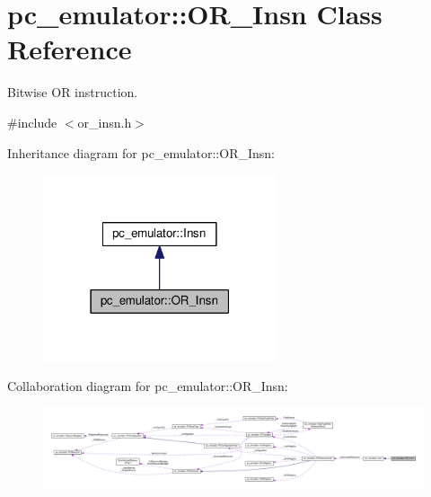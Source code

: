\hypertarget{classpc__emulator_1_1OR__Insn}{}\section{pc\+\_\+emulator\+:\+:O\+R\+\_\+\+Insn Class Reference}
\label{classpc__emulator_1_1OR__Insn}


Bitwise OR instruction.  




{\ttfamily \#include $<$or\+\_\+insn.\+h$>$}



Inheritance diagram for pc\+\_\+emulator\+:\+:O\+R\+\_\+\+Insn\+:\nopagebreak
\begin{figure}[H]
\begin{center}
\leavevmode
\includegraphics[width=195pt]{classpc__emulator_1_1OR__Insn__inherit__graph}
\end{center}
\end{figure}


Collaboration diagram for pc\+\_\+emulator\+:\+:O\+R\+\_\+\+Insn\+:\nopagebreak
\begin{figure}[H]
\begin{center}
\leavevmode
\includegraphics[width=350pt]{classpc__emulator_1_1OR__Insn__coll__graph}
\end{center}
\end{figure}
